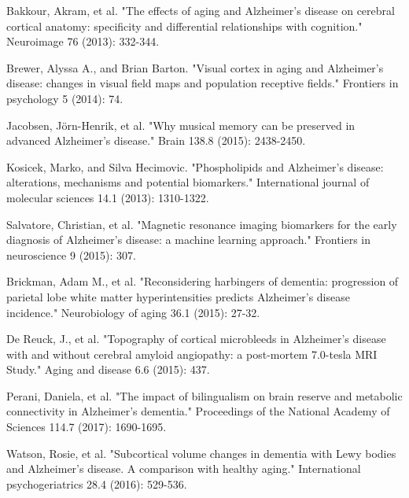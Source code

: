 \documentclass[preprint,12pt]{elsarticle}
\begin{document}
\begin{thebibliography}{1}
		
		
		Bakkour, Akram, et al. "The effects of aging and Alzheimer's disease on cerebral cortical anatomy: specificity and differential relationships with cognition." Neuroimage 76 (2013): 332-344.
		
		Brewer, Alyssa A., and Brian Barton. "Visual cortex in aging and Alzheimer's disease: changes in visual field maps and population receptive fields." Frontiers in psychology 5 (2014): 74.
		
		Jacobsen, Jörn-Henrik, et al. "Why musical memory can be preserved in advanced Alzheimer’s disease." Brain 138.8 (2015): 2438-2450.
		
		Kosicek, Marko, and Silva Hecimovic. "Phospholipids and Alzheimer’s disease: alterations, mechanisms and potential biomarkers." International journal of molecular sciences 14.1 (2013): 1310-1322.
		
		Salvatore, Christian, et al. "Magnetic resonance imaging biomarkers for the early diagnosis of Alzheimer's disease: a machine learning approach." Frontiers in neuroscience 9 (2015): 307.
		
		
		
		
	
		
		
		
		
		
		
		
		
		
		
		Brickman, Adam M., et al. "Reconsidering harbingers of dementia: progression of parietal lobe white matter hyperintensities predicts Alzheimer's disease incidence." Neurobiology of aging 36.1 (2015): 27-32.
		
		De Reuck, J., et al. "Topography of cortical microbleeds in Alzheimer’s disease with and without cerebral amyloid angiopathy: a post-mortem 7.0-tesla MRI Study." Aging and disease 6.6 (2015): 437.
		
		Perani, Daniela, et al. "The impact of bilingualism on brain reserve and metabolic connectivity in Alzheimer's dementia." Proceedings of the National Academy of Sciences 114.7 (2017): 1690-1695.
		
		Watson, Rosie, et al. "Subcortical volume changes in dementia with Lewy bodies and Alzheimer's disease. A comparison with healthy aging." International psychogeriatrics 28.4 (2016): 529-536.
		

\end{thebibliography}
\end{document}
